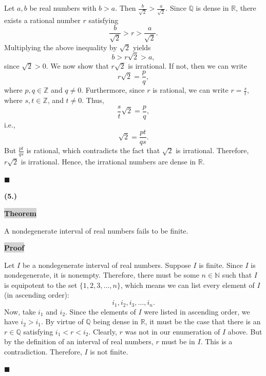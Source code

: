 \documentclass[12pt]{article}
\newcommand{\mybox}{%
    \collectbox{%
        \setlength{\fboxsep}{2pt}%
        \fbox{\BOXCONTENT}%
    }%
}
\begin{document}
\noindent Let $a,b$ be real numbers with $b>a$. Then $\frac{b}{\sqrt{2}}>\frac{a}{\sqrt{2}}$. Since $\mathbb{Q}$ is dense in $\mathbb{R}$, there exists a rational number $r$ satisfying $$\frac{b}{\sqrt{2}} > r > \frac{a}{\sqrt{2}}.$$ Multiplying the above inequality by $\sqrt{2}$ yields $$b>r\sqrt{2}>a,$$ since $\sqrt{2}>0.$ We now show that $r\sqrt{2}$ is irrational. If not, then we can write $$r\sqrt{2} = \frac{p}{q},$$ where $p,q\in\mathbb{Z}$ and $q\neq 0$. Furthermore, since $r$ is rational, we can write $r=\frac{s}{t}$, where $s,t\in\mathbb{Z}$, and $t\neq 0$. Thus, $$\frac{s}{t}\sqrt{2}=\frac{p}{q},$$ i.e., $$\sqrt{2} = \frac{pt}{qs}.$$  But $\frac{pt}{qs}$ is rational, which contradicts the fact that $\sqrt{2}$ is irrational. Therefore, $r\sqrt{2}$ is irrational. Hence, the irrational numbers are dense in $\mathbb{R}.$

\hfill$\blacksquare$

\pagebreak

\noindent \textbf{(5.)}

\vspace{3mm}

\noindent\mybox{\colorbox{lightgray}{\textbf{Theorem}}}\hspace{3mm}\hrulefill

\noindent A nondegenerate interval of real numbers fails to be finite.

\vspace{5mm}

\noindent\mybox{\colorbox{lightgray}{\textbf{Proof}}}\hspace{3mm}\hrulefill

\noindent Let $I$ be a nondegenerate interval of real numbers. Suppose $I$ is finite. Since $I$ is nondegenerate, it is nonempty. Therefore, there must be some $n\in\mathbb{N}$ such that $I$ is equipotent to the set $\lbrace1, 2, 3, \ldots, n\rbrace$, which means we can list every element of $I$ (in ascending order): $$ i_1, i_2, i_3, \ldots, i_n.$$ Now, take $i_1$ and $i_2$. Since the elements of $I$ were listed in ascending order, we have $i_2 > i_1$. By virtue of $\mathbb{Q}$ being dense in $\mathbb{R}$, it must be the case that there is an $r\in\mathbb{Q}$ satisfying $i_1 < r < i_2$. Clearly, $r$ was not in our enumeration of $I$ above. But by the definition of an interval of real numbers, $r$ must be in $I$. This is a contradiction. Therefore, $I$ is not finite.

\hfill$\blacksquare$

\pagebreak
\end{document}
